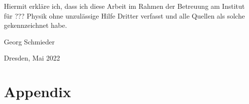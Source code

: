 \clearpage
\thispagestyle{empty}
\vspace*{1.5em}

Hiermit erkläre ich, dass ich diese Arbeit im Rahmen der Betreuung am Institut
für ??? Physik ohne unzulässige Hilfe Dritter verfasst und alle Quellen als solche gekennzeichnet habe.

\vspace*{45em}

Georg Schmieder \par
Dresden, Mai 2022

\chapter{Appendix}
\label{sec:appendix}


